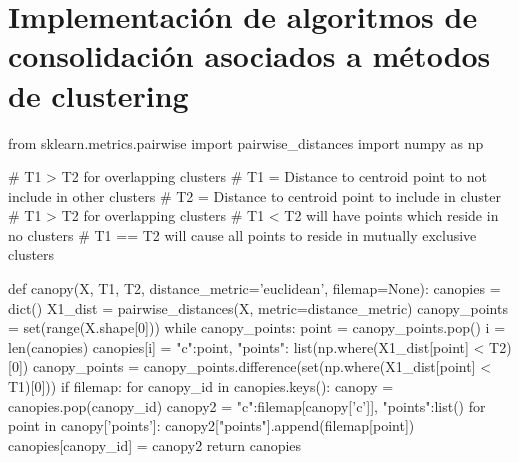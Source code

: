 \documentclass[a4paper, 12pt, spanish]{article}
\begin{document}
\newpage
\section{Implementaci\'on de algoritmos de consolidaci\'on asociados a m\'etodos de clustering}\label{App:AppendixB}

\begin{python}[caption=Preprocesado de Canopy]\label{App:Canopy}
from sklearn.metrics.pairwise import pairwise_distances
import numpy as np

# T1 > T2 for overlapping clusters
# T1 = Distance to centroid point to not include in other clusters
# T2 = Distance to centroid point to include in cluster
# T1 > T2 for overlapping clusters
# T1 < T2 will have points which reside in no clusters
# T1 == T2 will cause all points to reside in mutually exclusive clusters

def canopy(X, T1, T2, distance_metric='euclidean', filemap=None):
    canopies = dict()
    X1_dist = pairwise_distances(X, metric=distance_metric)
    canopy_points = set(range(X.shape[0]))
    while canopy_points:
        point = canopy_points.pop()
        i = len(canopies)
        canopies[i] = {"c":point, "points": list(np.where(X1_dist[point] < T2)[0])}
        canopy_points = canopy_points.difference(set(np.where(X1_dist[point] < T1)[0]))
    if filemap:
        for canopy_id in canopies.keys():
            canopy = canopies.pop(canopy_id)
            canopy2 = {"c":filemap[canopy['c']], "points":list()}
            for point in canopy['points']:
                canopy2["points"].append(filemap[point])
            canopies[canopy_id] = canopy2
    return canopies

\end{python}



\pagebreak
\end{document}
